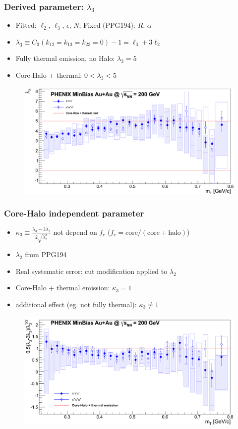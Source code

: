 \documentclass{beamer}
\begin{document}
\begin{frame}
\frametitle{Derived parameter: $\lambda_3$}
\begin{itemize}
\setlength{\itemsep}{10pt}
\item Fitted: $\ell_2$, $\ell_3$, $\epsilon$, $N$; Fixed (PPG194): $R$, $\alpha$
\item $\lambda_3 \equiv  C_3(k_{12}=k_{13}=k_{23}=0)-1 = \ell_3+3\ell_2$
\item  Fully thermal emission, no Halo: $\lambda_3=5$
\item Core-Halo + thermal: $0<\lambda_3<5$
\end{itemize}
\begin{figure}
\includegraphics[scale=0.3]{pic/lambda3}
\end{figure}
\end{frame}



\begin{frame}
\frametitle{Core-Halo independent parameter}
\begin{itemize}
\item $\kappa_3\equiv\frac{\lambda_3-3\lambda_2}{2\sqrt{\lambda_2^3}}$ not depend on $f_c$ ($f_c=\mathrm{core}/(\mathrm{core}+\mathrm{halo})$)
\item $\lambda_2$ from PPG194
\item Real systematic error: cut modification applied to $\lambda_2$
\item Core-Halo + thermal emission: $\kappa_3=1$
\item additional effect (eg. not fully thermal): $\kappa_3\neq 1$
\end{itemize}
\begin{figure}
\includegraphics[scale=0.3]{pic/npar}
\end{figure}
\end{frame}
\end{document}
